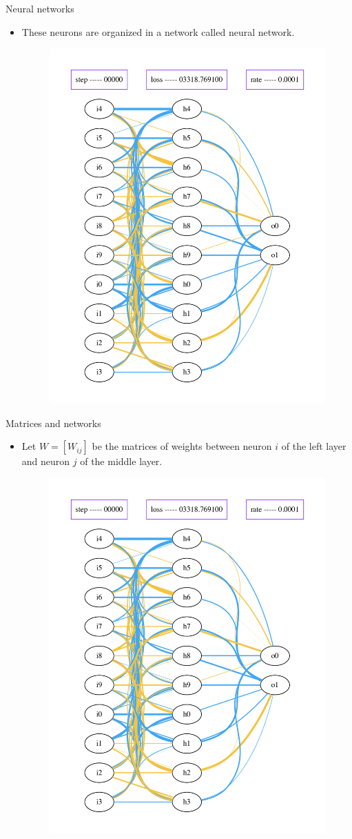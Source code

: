 \documentclass{beamer}
\begin{document}
\begin{frame}{Neural networks}
    \begin{itemize}
        \item These neurons are organized in a network called neural network.
            \begin{figure}[htpb]
                \centering
                \includegraphics[width=0.5\linewidth]{net_0}
                \label{fig:name}
            \end{figure}
    \end{itemize}
\end{frame}

\begin{frame}{Matrices and networks}
    \begin{itemize}
        \item Let $W=[W_{ij}]$ be the matrices of weights between neuron $i$ of
            the left layer and neuron $j$ of the middle layer.
            \begin{figure}[htpb]
                \centering
                \includegraphics[width=0.5\linewidth]{net_0}
                \label{fig:name}
            \end{figure}
    \end{itemize}
\end{frame}
\end{document}
